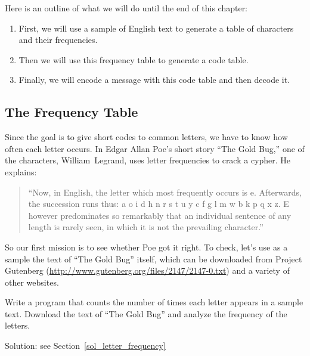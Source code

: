 Here is an outline of what we will do until the end of this 
chapter:

\begin{enumerate}

\item First, we will use a sample of English text to generate 
a table of characters and their frequencies.

\item Then we will use this frequency table to generate a code 
table.

\item Finally, we will encode a message with this code table 
and then decode it.

\end{enumerate}

\subsection{The Frequency Table}

Since the goal is to give short codes to common letters, we 
have to know how often each letter occurs. In Edgar Allan Poe’s 
short story ``The Gold Bug,'' one of the characters, William~Legrand, 
uses letter frequencies to crack a cypher. He explains:

\begin{quote}
``Now, in English, the letter which most frequently occurs 
is e. Afterwards, the succession runs thus: a o i d h n r s 
t u y c f g l m w b k p q x z. E however predominates so 
remarkably that an individual sentence of any length is 
rarely seen, in which it is not the prevailing character.''
\end{quote}

So our first mission is to see whether Poe got it right. 
To check, let's use as a sample the text of ``The Gold Bug'' 
itself, which can be downloaded from Project Gutenberg 
(\url{http://www.gutenberg.org/files/2147/2147-0.txt}) and 
a variety of other websites. 

\begin{exercise}
\label{letter_frequency}
Write a program that counts the number of times each letter 
appears in a sample text. Download the text of ``The Gold Bug'' 
and analyze the frequency of the letters.

Solution: see Section~\ref{sol_letter_frequency}
\end{exercise}


